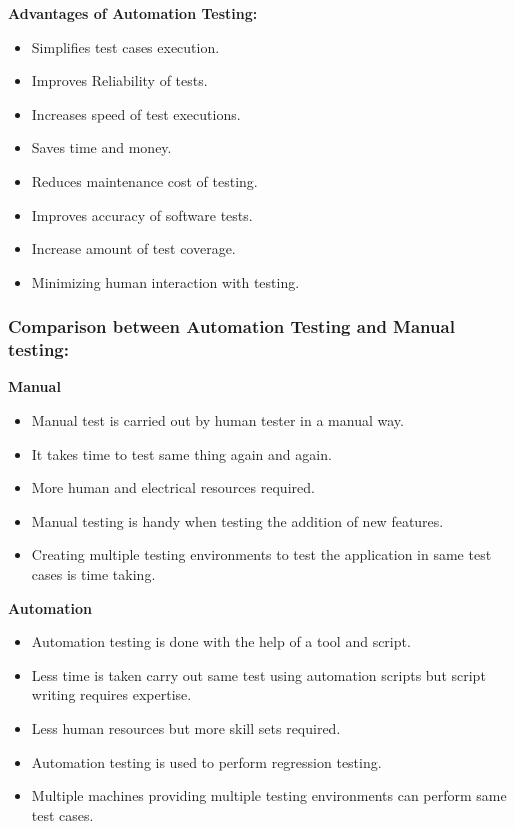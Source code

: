 \textbf{Advantages of Automation Testing:}
\begin{itemize}
\item Simplifies test cases execution.
\item Improves Reliability of tests.
\item Increases speed of test executions.
\item Saves time and money.
\item Reduces maintenance cost of testing.
\item Improves accuracy of software tests.
\item Increase amount of test coverage.
\item Minimizing human interaction with testing.
\end{itemize}

\subsubsection{Comparison between Automation Testing and Manual testing:}

\textbf{Manual}
\begin{itemize}
\item Manual test is carried out by human tester in a manual way.
\item It takes time to test same thing again and again.
\item More human and electrical resources required.
\item Manual testing is handy when testing the addition of new features.
\item Creating multiple testing environments to test the application in same test cases is time taking.
\end{itemize}

\textbf{Automation}
\begin{itemize}
\item Automation testing is done with the help of a tool and script.
\item Less time is taken carry out same test using automation scripts but script writing requires expertise.
\item Less human resources but more skill sets required.
\item Automation testing is used to perform regression testing.
\item Multiple machines providing multiple testing environments can perform same test cases.
\end{itemize}



